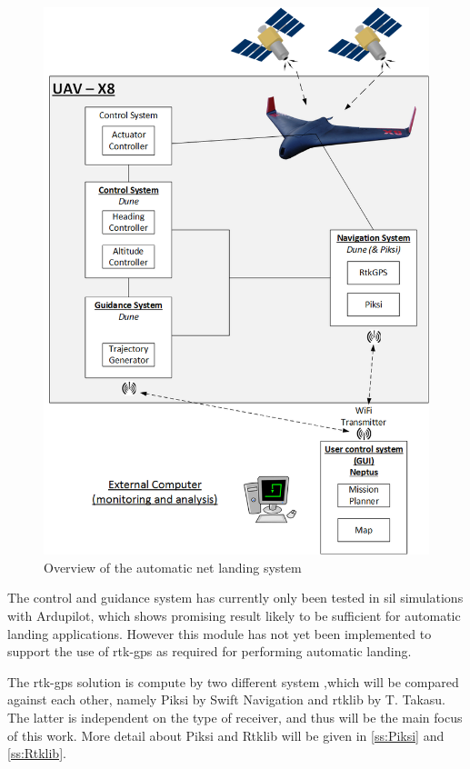 \begin{figure}[H]
	\centering
		\includegraphics[width=1\textwidth]{figs/System.png}
		\caption{Overview of the automatic net landing system}
		\label{figure:SystemOverview}
\end{figure}

The control and guidance system has currently only been tested in \gls{sil} simulations with Ardupilot, which shows promising result likely to be sufficient for automatic landing applications. However this module has not yet been implemented to support the use of \gls{rtk-gps} as required for performing automatic landing.

The \gls{rtk-gps} solution is compute by two different system ,which will be compared against each other, namely Piksi by Swift Navigation and \gls{rtklib} by T. Takasu. The latter is independent on the type of receiver, and thus will be the main focus of this work. More detail about Piksi and Rtklib will be given in \ref{ss:Piksi} and \ref{ss:Rtklib}.

